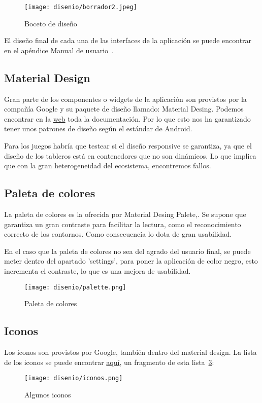 \begin{figure}[H]
	\centering
	\texttt{[image: disenio/borrador2.jpeg]}
	\caption{Boceto de diseño}\label{fig:borrador}
\end{figure}

El diseño final de cada una de las interfaces de la aplicación se puede encontrar en el apéndice Manual de usuario~\pageref{manualusuario}.

\subsection{Material Design}
Gran parte de los componentes o widgets de la aplicación son provistos por la compañía Google y su paquete de diseño llamado: Material Desing. Podemos encontrar en la \href{https://material.io/develop/flutter}{web} toda la documentación. Por lo que esto nos ha garantizado tener unos patrones de diseño según el estándar de Android. 

Para los juegos habría que testear si el diseño responsive se garantiza, ya que el diseño de los tableros está en contenedores que no son dinámicos. Lo que implica que con la gran heterogeneidad del ecosistema, encontremos fallos.

\subsection{Paleta de colores}
La paleta de colores es la ofrecida por Material Desing Palete,. Se supone que garantiza un gran contraste para facilitar la lectura, como el reconocimiento correcto de los contornos. Como consecuencia lo dota de gran usabilidad.

En el caso que la paleta de colores no sea del agrado del usuario final, se puede meter dentro del apartado 'settings', para poner la aplicación de color negro, esto incrementa el contraste, lo que es una mejora de usabilidad.

\begin{figure}[H]
	\centering
	\texttt{[image: disenio/palette.png]}
	\caption{Paleta de colores}\label{fig:palette}
\end{figure}

\subsection{Iconos}
Los iconos son provistos por Google, también dentro del material design. La lista de los iconos se puede encontrar \href{https://material.io/resources/icons/?style=sharp}{aquí}, un fragmento de esta lista~\ref{fig:iconos}:

\begin{figure}[H]
	\centering
	\texttt{[image: disenio/iconos.png]}
	\caption{Algunos iconos}\label{fig:iconos}
\end{figure}


